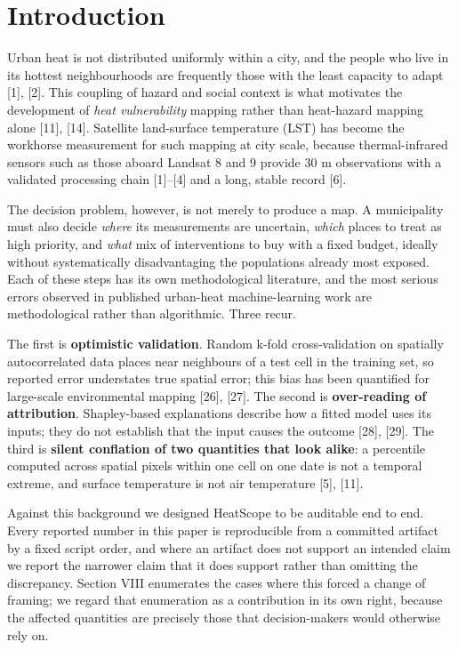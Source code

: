 \section{Introduction}\label{i.-introduction}

Urban heat is not distributed uniformly within a city, and the people who live in its hottest
neighbourhoods are frequently those with the least capacity to adapt {[}1{]}, {[}2{]}. This coupling of
hazard and social context is what motivates the development of \emph{heat vulnerability} mapping rather
than heat-hazard mapping alone {[}11{]}, {[}14{]}. Satellite land-surface temperature (LST) has become the
workhorse measurement for such mapping at city scale, because thermal-infrared sensors such as those
aboard Landsat 8 and 9 provide 30 m observations with a validated processing chain {[}1{]}--{[}4{]} and a
long, stable record {[}6{]}.

The decision problem, however, is not merely to produce a map. A municipality must also decide
\emph{where} its measurements are uncertain, \emph{which} places to treat as high priority, and \emph{what} mix of
interventions to buy with a fixed budget, ideally without systematically disadvantaging the
populations already most exposed. Each of these steps has its own methodological literature, and the
most serious errors observed in published urban-heat machine-learning work are methodological rather
than algorithmic. Three recur.

The first is \textbf{optimistic validation}. Random k-fold cross-validation on spatially autocorrelated
data places near neighbours of a test cell in the training set, so reported error understates true
spatial error; this bias has been quantified for large-scale environmental mapping {[}26{]}, {[}27{]}. The
second is \textbf{over-reading of attribution}. Shapley-based explanations describe how a fitted model
uses its inputs; they do not establish that the input causes the outcome {[}28{]}, {[}29{]}. The third is
\textbf{silent conflation of two quantities that look alike}: a percentile computed across spatial pixels
within one cell on one date is not a temporal extreme, and surface temperature is not air
temperature {[}5{]}, {[}11{]}.

Against this background we designed HeatScope to be auditable end to end. Every reported number in
this paper is reproducible from a committed artifact by a fixed script order, and where an artifact
does not support an intended claim we report the narrower claim that it does support rather than
omitting the discrepancy. Section VIII enumerates the cases where this forced a change of framing;
we regard that enumeration as a contribution in its own right, because the affected quantities are
precisely those that decision-makers would otherwise rely on.

